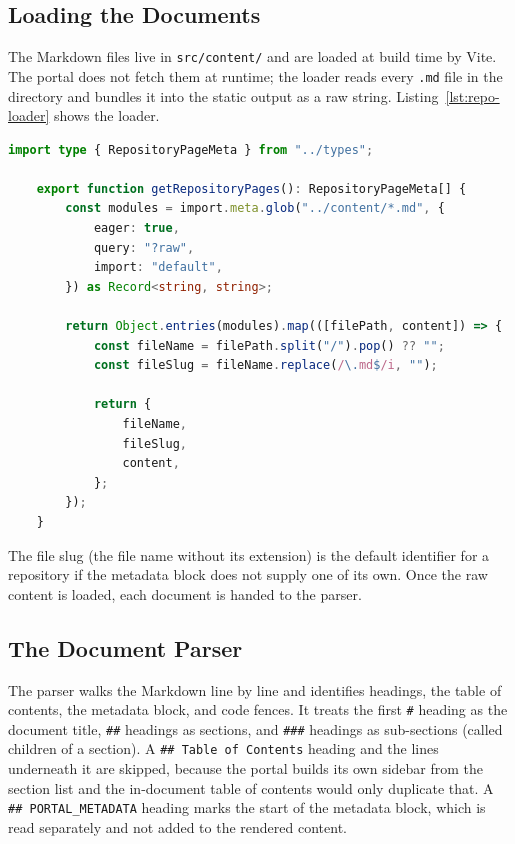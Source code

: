 \subsection{Loading the Documents}\label{subsec:dev-parser-loading}

The Markdown files live in \texttt{src/content/} and are loaded at build time by Vite. The portal does not fetch them at runtime; the loader reads every \texttt{.md} file in the directory and bundles it into the static output as a raw string. Listing~\ref{lst:repo-loader} shows the loader.

\begin{lstlisting}[language=TypeScript,caption={\texttt{getRepositoryPages} loads every Markdown file from \texttt{src/content/} as a raw string at build time.},label={lst:repo-loader}]
	import type { RepositoryPageMeta } from "../types";
	
	export function getRepositoryPages(): RepositoryPageMeta[] {
		const modules = import.meta.glob("../content/*.md", {
			eager: true,
			query: "?raw",
			import: "default",
		}) as Record<string, string>;
		
		return Object.entries(modules).map(([filePath, content]) => {
			const fileName = filePath.split("/").pop() ?? "";
			const fileSlug = fileName.replace(/\.md$/i, "");
			
			return {
				fileName,
				fileSlug,
				content,
			};
		});
	}
\end{lstlisting}

The file slug (the file name without its extension) is the default identifier for a repository if the metadata block does not supply one of its own. Once the raw content is loaded, each document is handed to the parser.

\subsection{The Document Parser}\label{subsec:dev-parser-document}

The parser walks the Markdown line by line and identifies headings, the table of contents, the metadata block, and code fences. It treats the first \texttt{\#} heading as the document title, \texttt{\#\#} headings as sections, and \texttt{\#\#\#} headings as sub-sections (called children of a section). A \texttt{\#\# Table of Contents} heading and the lines underneath it are skipped, because the portal builds its own sidebar from the section list and the in-document table of contents would only duplicate that. A \texttt{\#\# PORTAL\_METADATA} heading marks the start of the metadata block, which is read separately and not added to the rendered content.

